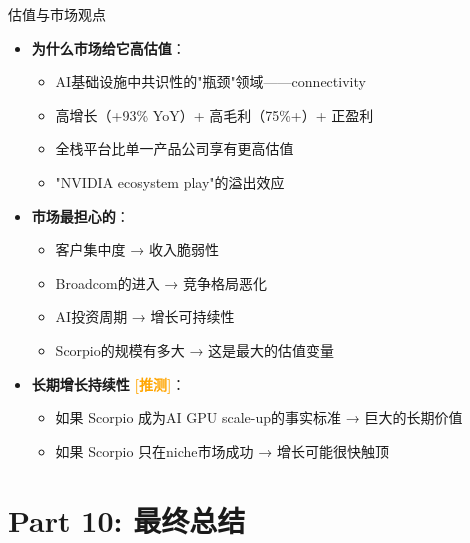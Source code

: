 \documentclass[UTF8,11pt,aspectratio=169]{beamer}
\newcommand{\speculation}{{\textcolor{orange}{\textbf{[推测]}}}}
\begin{document}
\begin{frame}{估值与市场观点}
    \begin{itemize}
        \item \textbf{为什么市场给它高估值}：
            \begin{itemize}
                \item AI基础设施中共识性的"瓶颈"领域——connectivity
                \item 高增长（+93\% YoY）+ 高毛利（75\%+）+ 正盈利
                \item 全栈平台比单一产品公司享有更高估值
                \item "NVIDIA ecosystem play"的溢出效应
            \end{itemize}
        \item \textbf{市场最担心的}：
            \begin{itemize}
                \item 客户集中度 → 收入脆弱性
                \item Broadcom的进入 → 竞争格局恶化
                \item AI投资周期 → 增长可持续性
                \item Scorpio的规模有多大 → 这是最大的估值变量
            \end{itemize}
        \item \textbf{长期增长持续性} \speculation{}：
            \begin{itemize}
                \item 如果 Scorpio 成为AI GPU scale-up的事实标准 → 巨大的长期价值
                \item 如果 Scorpio 只在niche市场成功 → 增长可能很快触顶
            \end{itemize}
    \end{itemize}
\end{frame}

\section{Part 10: 最终总结}
\end{document}

